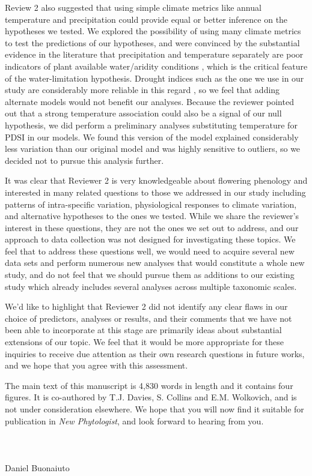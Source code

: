 \documentclass{article}[12pt]
\begin{document}
Review 2 also suggested that using simple climate metrics like annual temperature and precipitation could provide equal or better inference on the hypotheses we tested. We explored the possibility of using many climate metrics to test the predictions of our hypotheses, and were convinced by the substantial evidence in the literature that precipitation and temperature separately are poor indicators of plant available water/aridity conditions \citep{Moles_2014,Piedallu_2013,Hickler_2009}, which is the critical feature of the water-limitation hypothesis. Drought indices such as the one we use in our study are considerably more reliable in this regard \citep{Moles_2014,Dai:2004aa,MIKA2005223}, so we feel that adding alternate models would not benefit our analyses. Because the reviewer pointed out that a strong temperature association could also be a signal of our null hypothesis, we did perform a preliminary analyses substituting temperature for PDSI in our models. We found this version of the model explained considerably less variation than our original model and was highly sensitive to outliers, so we decided not to pursue this analysis further.

It was clear that Reviewer 2 is very knowledgeable about flowering phenology and interested in many related questions to those we addressed in our study including patterns of intra-specific variation, physiological responses to climate variation, and alternative hypotheses to the ones we tested. While we share the reviewer's interest in these questions, they are not the ones we set out to address, and our approach to data collection was not designed for investigating these topics. We feel that to address these questions well, we would need to acquire several new data sets and perform numerous new analyses that would constitute a whole new study, and do not feel that we should pursue them as additions to our existing study which already includes several analyses across multiple taxonomic scales. 

We'd like to highlight that Reviewer 2 did not identify any clear flaws in our choice of predictors, analyses or results, and their comments that we have not been able to incorporate at this stage are primarily ideas about substantial extensions of our topic. We feel that it would be more appropriate for these inquiries to receive due attention as their own research questions in future works, and we hope that you agree with this assessment.

The main text of this manuscript is 4,830 words in length and it contains four figures. It is co-authored by T.J. Davies, S. Collins and E.M. Wolkovich, and is not under consideration elsewhere. We hope that you will now find it suitable for publication in \emph{New Phytologist}, and look forward to hearing from you.\\\\\\\\

\noindent Daniel Buonaiuto\\

 
\end{document}
